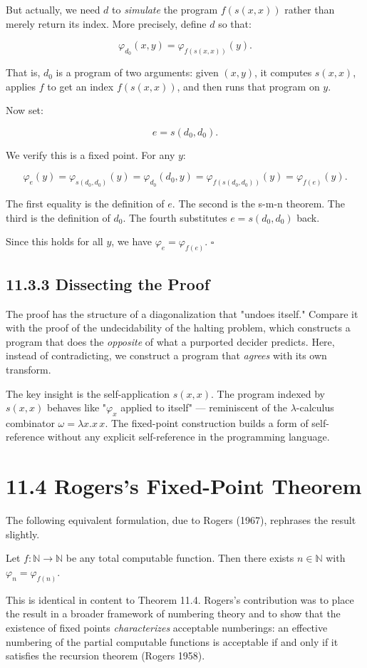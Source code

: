 But actually, we need $d$ to \textit{simulate} the program $f(s(x, x))$ rather than merely return its index. More precisely, define $d$ so that:

\[
\varphi_{d_0}(x, y) = \varphi_{f(s(x,x))}(y).
\]

That is, $d_0$ is a program of two arguments: given $(x, y)$, it computes $s(x, x)$, applies $f$ to get an index $f(s(x, x))$, and then runs that program on $y$.

Now set:

\[
e = s(d_0, d_0).
\]

We verify this is a fixed point. For any $y$:

\[
\varphi_e(y) = \varphi_{s(d_0, d_0)}(y) = \varphi_{d_0}(d_0, y) = \varphi_{f(s(d_0, d_0))}(y) = \varphi_{f(e)}(y).
\]

The first equality is the definition of $e$. The second is the s-m-n theorem. The third is the definition of $d_0$. The fourth substitutes $e = s(d_0, d_0)$ back.

Since this holds for all $y$, we have $\varphi_e = \varphi_{f(e)}$. $\square$

\subsection{11.3.3 Dissecting the Proof}

The proof has the structure of a diagonalization that "undoes itself." Compare it with the proof of the undecidability of the halting problem, which constructs a program that does the \textit{opposite} of what a purported decider predicts. Here, instead of contradicting, we construct a program that \textit{agrees} with its own transform.

The key insight is the self-application $s(x, x)$. The program indexed by $s(x, x)$ behaves like "$\varphi_x$ applied to itself" --- reminiscent of the $\lambda$-calculus combinator $\omega = \lambda x. x\, x$. The fixed-point construction builds a form of self-reference without any explicit self-reference in the programming language.

\section{11.4 Rogers's Fixed-Point Theorem}

The following equivalent formulation, due to Rogers (1967), rephrases the result slightly.

\begin{theorem}
Let $f: \mathbb{N} \to \mathbb{N}$ be any total computable function. Then there exists $n \in \mathbb{N}$ with $\varphi_n = \varphi_{f(n)}$.

This is identical in content to Theorem 11.4. Rogers's contribution was to place the result in a broader framework of numbering theory and to show that the existence of fixed points \textit{characterizes} acceptable numberings: an effective numbering of the partial computable functions is acceptable if and only if it satisfies the recursion theorem (Rogers 1958).
\end{theorem}

